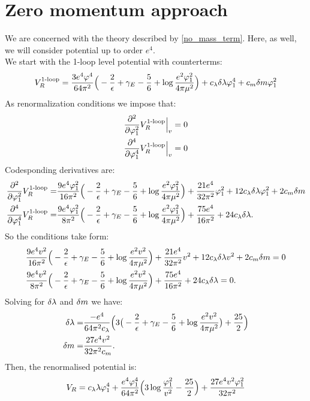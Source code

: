 \section{Zero momentum approach}
We are concerned with the theory described by \ref{no_mass_term}.
Here, as well, we will consider potential up to order $e^4$. \\
We start with the 1-loop level potential with counterterms:
\begin{align}
V_R^{\textrm{1-loop}} = \frac{3e^4\varphi^4}{64\pi^2}\Big(-\frac{2}{\epsilon}+\gamma_E-\frac{5}{6}+
\log{\frac{e^2\varphi_1^2}{4\pi\mu^2}}\Big) + c_\lambda\delta\lambda\varphi_1^4+c_m\delta m\varphi_1^2
\end{align}
As renormalization conditions we impose that:
\begin{align}
\frac{\partial^2 }{\partial \varphi_1^2}V_R^{\textrm{1-loop}}\Big|_{v} &= 0 \\
\frac{\partial^4 }{\partial \varphi_1^4}V_R^{\textrm{1-loop}}\Big|_{v} &= 0
\end{align}
Codesponding derivatives are:
\begin{align}
\frac{\partial^2 }{\partial \varphi_1^2}V_R^{\textrm{1-loop}} = &\frac{9e^4\varphi_1^2}{16\pi^2}\Big(-\frac{2}{\epsilon}+\gamma_E-
\frac{5}{6}+\log{\frac{e^2\varphi_1^2}{4\pi\mu^2}}\Big)+\frac{21e^4}{32\pi^2}\varphi_1^2+ 
12c_\lambda\delta\lambda\varphi_1^2+2c_m\delta m \\
\frac{\partial^4 }{\partial \varphi_1^4}V_R^{\textrm{1-loop}} = &\frac{9e^4\varphi_1^2}{8\pi^2}\Big(-\frac{2}{\epsilon}+\gamma_E-
\frac{5}{6}+\log{\frac{e^2\varphi_1^2}{4\pi\mu^2}}\Big)+\frac{75e^4}{16\pi^2}+24c_\lambda\delta\lambda.
\end{align}
So the conditions take form:
\begin{align}
&\frac{9e^4v^2}{16\pi^2}\Big(-\frac{2}{\epsilon}+\gamma_E-
\frac{5}{6}+\log{\frac{e^2v^2}{4\pi\mu^2}}\Big)+\frac{21e^4}{32\pi^2}v^2+ 
12c_\lambda\delta\lambda v^2+2c_m\delta m = 0\\
&\frac{9e^4v^2}{8\pi^2}\Big(-\frac{2}{\epsilon}+\gamma_E-
\frac{5}{6}+\log{\frac{e^2v^2}{4\pi\mu^2}}\Big)+\frac{75e^4}{16\pi^2}+24c_\lambda\delta\lambda = 0.
\end{align}
Solving for $\delta\lambda$ and $\delta m$ we have:
\begin{align}
\delta\lambda = &\frac{-e^4}{64\pi^2c_\lambda}\Big(3\big(-\frac{2}{\epsilon}+\gamma_E-
\frac{5}{6}+\log\frac{e^2v^2}{4\pi\mu^2}\big)+\frac{25}{2}\Big) \\
\delta m = &\frac{27e^4v^2}{32\pi^2c_m}.
\end{align}
Then, the renormalised potential is:
\begin{align}
V_R = c_\lambda\lambda\varphi_1^4 + \frac{e^4\varphi_1^4}{64\pi^2}\Big(3\log\frac{\varphi_1^2}{v^2}- 
\frac{25}{2}\Big)+
\frac{27e^4v^2\varphi_1^2}{32\pi^2}
\end{align}
